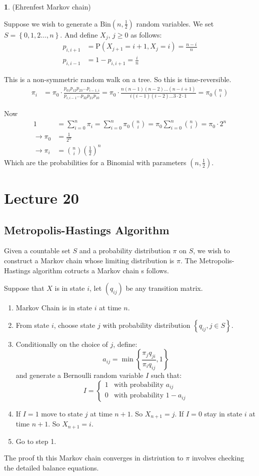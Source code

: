 \documentclass[english,12pt]{article}
\theoremstyle{plain}
\theoremstyle{definition}
\newtheorem*{example}{\protect\examplename}
\theoremstyle{definition} %
\newcommand{\eg}[1]{\begin{example} #1 \end{example} }
\providecommand{\examplename}{Example}
\newcommand{\enum}[1]{\begin{enumerate} #1 \end{enumerate}}
\newcommand{\brac}[1]{\left(#1\right)} %
\newcommand{\curlybrac}[1]{\left\{#1\right\}} %
\newcommand{\p}[1]{\mbox{P} \left( #1 \right)}
\begin{document}
\eg{ (Ehrenfest Markov chain)

Suppose we wish to generate a $\text{Bin}\brac{n,\frac{1}{2}}$ random variables.  We set $S=\curlybrac{0,1,2\ldots, n}$.  And define $X_j$, $j\ge 0$ as follows:
\begin{align*}
p_{i,i+1}&=\p{X_{j+1}=i+1,X_j=i}=\frac{n-i}{n}\\
p_{i,i-1}&=1-p_{i,i+1}=\frac{i}{n}
\end{align*}

This is a non-symmetric random walk on a tree.  So this is time-reversible.
\begin{align*}
\pi_i&=\pi_0\cdot\frac{p_{01}p_{12}p_{23}\ldots p_{i-1,i}}{p_{i,i-1}\ldots p_{32}p_{21}p_{10}}
=\pi_0\cdot\frac{n(n-1)(n-2)\ldots (n-i+1)}{i(i-1)(i-2)\ldots 3\cdot 2\cdot 1}
=\pi_0{n\choose i}
\end{align*}

Now
\begin{align*}
1&=\sum_{i=0}^n\pi_i
=\sum_{i=0}^n\pi_0{n\choose i}
=\pi_0\sum_{i=0}^n{n\choose i}
=\pi_0\cdot 2^n\\
\rightarrow \pi_0&=\frac{1}{2^n}\\
\rightarrow \pi_i&={n\choose i}\brac{\frac{1}{2}}^n
\end{align*}
Which are the probabilities for a Binomial with parameters $(n,\frac{1}{2})$.
}

\section*{Lecture 20}
\subsection{Metropolis-Hastings Algorithm}
Given a countable set $S$ and a probability distribution $\pi$ on $S$, we wish to construct a Markov chain whose limiting distribution is $\pi$.  The Metropolis-Hastings algorithm cotructs a Markov chain s follows.

Suppose that $X$ is in state $i$, let $(q_{ij})$ be any transition matrix.
\enum{
\item Markov Chain is in state $i$ at time $n$.
\item From state $i$, choose state $j$ with probability distribution $\curlybrac{q_{ij},j\in S}$.
\item Conditionally on the choice of $j$, define:
\[a_{ij}=\min\curlybrac{\frac{\pi_jq_{ji}}{\pi_iq_{ij}},1}\]
and generate a Bernoulli random variable $I$ such that:
\[I=\begin{cases}
1 & \text{with probability }a_{ij}\\
0 & \text{with probability }1-a_{ij}
\end{cases}\]
\item If $I=1$ move to state $j$ at time $n+1$.  So $X_{n+1}=j$.  If $I=0$ stay in state $i$ at time $n+1$.  So $X_{n+1}=i$.
\item Go to step 1.
}
The proof th this Markov chain converges in distriution to $\pi$ involves checking the detailed balance equations.
\end{document}
